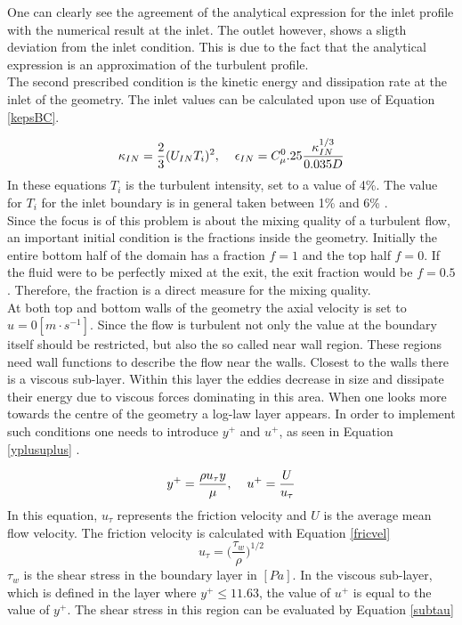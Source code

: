 \documentclass{CFD2017}
\begin{document}

One can clearly see the agreement of the analytical expression for the inlet profile with the numerical result at the inlet. The outlet however, shows a sligth deviation from the inlet condition. This is due to the fact that the analytical expression is an approximation of the turbulent profile.\\
The second prescribed condition is the kinetic energy and dissipation rate at the inlet of the geometry. The inlet values can be calculated upon use of Equation \ref{kepsBC}.

\begin{equation}
\label{kepsBC}
\kappa_{IN}=\frac{2}{3}(U_{IN}T_i)^2,\hspace{4mm}\epsilon_{IN}=C_{\mu}^0.25\frac{\kappa_{IN}^{1/3}}{0.035 D}
\end{equation}
In these equations $T_i$ is the turbulent intensity, set to a value of 4\%. The value for $T_i$ for the inlet boundary is in general taken between 1\% and 6\% \cite{Versteeg2007}.\\
Since the focus is of this problem is about the mixing quality of a turbulent flow, an important initial condition is the fractions inside the geometry. Initially the entire bottom half of the domain has a fraction $f=1$ and the top half $f=0$. If the fluid were to be perfectly mixed at the exit, the exit fraction would be $f=0.5$. Therefore, the fraction is a direct measure for the mixing quality.\\

At both top and bottom walls of the geometry the axial velocity is set to $u=0[m\cdot s^{-1}]$. Since the flow is turbulent not only the value at the boundary itself should be restricted, but also the so called near wall region. These regions need wall functions to describe the flow near the walls. Closest to the walls there is a viscous sub-layer. Within this layer the eddies decrease in size and dissipate their energy due to viscous forces dominating in this area. When one looks more towards the centre of the geometry a log-law layer appears. In order to implement such conditions one needs to introduce $y^+$ and $u^+$, as seen in Equation \ref{yplusuplus} \cite{Versteeg2007}.

\begin{equation}
\label{yplusuplus}
y^+=\frac{\rho u_{\tau}y}{\mu},\hspace{4mm}u^+=\frac{U}{ u_{\tau}}
\end{equation}
In this equation, $ u_{\tau}$ represents the friction velocity and $U$ is the average mean flow velocity. The friction velocity is calculated with Equation \ref{fricvel}
\begin{equation}
\label{fricvel}
u_{\tau}=\big(\frac{\tau_w}{\rho}\big)^{1/2}
\end{equation}
$\tau_w$ is the shear stress in the boundary layer in $[Pa]$. In the viscous sub-layer, which is defined in the layer where $y^+\leq 11.63$, the value of $u^+$ is equal to the value of $y^+$. The shear stress in this region can be evaluated by Equation \ref{subtau}
\end{document}
